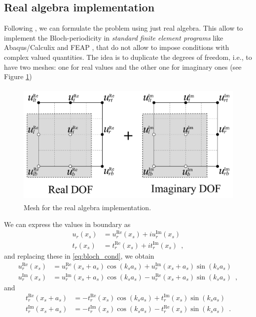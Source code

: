 \subsection{Real algebra implementation}
Following \cite{aberg1997}, we can formulate the problem using just real algebra. This allow to implement the Bloch-periodicity in \emph{standard finite element programs} like Abaqus/Calculix and FEAP \cite{feap_manual,Abaqus_manual,Calculix_manual}, that do not allow to impose conditions with complex valued quantities. The idea is to duplicate the degrees of freedom, i.e., to have two meshes: one for real values and the other one for imaginary ones (see Figure \ref{fig:double_mesh_real})
\begin{figure}[h]
\centering
\includegraphics[height=6cm]{img/cell_FEM-real_algebra.pdf} 
\caption{Mesh for the real algebra implementation.}
\label{fig:double_mesh_real}
\end{figure}

We can express the values in boundary as
\begin{align*}
u_r(x_s) &= u_r^\text{Re}(x_s) + i u_r^\text{Im}(x_s)\\
t_r(x_s) &= t_r^\text{Re}(x_s) + i t_r^\text{Im}(x_s) \enspace ,
\end{align*}
and replacing these in \eqref{eq:bloch_cond}, we obtain
\begin{subequations}
\begin{align}
u_r^\text{Re}(x_s) &= u_r^\text{Re}(x_s + a_s)\cos(k_s a_s) + u_r^\text{Im}(x_s + a_s)\sin(k_s a_s)\\
u_r^\text{Im}(x_s) &= u_r^\text{Im}(x_s + a_s)\cos(k_s a_s) - u_r^\text{Re}(x_s + a_s)\sin(k_s a_s) \enspace ,
\end{align}
\label{eq:real_bloch_disp}
\end{subequations}
and
\begin{subequations}
\begin{align}
t_r^\text{Re}(x_s + a_s) &= -t_r^\text{Re}(x_s)\cos(k_s a_s) + t_r^\text{Im}(x_s)\sin(k_s a_s)\\
t_r^\text{Im}(x_s + a_s) &= -t_r^\text{Im}(x_s)\cos(k_s a_s) - t_r^\text{Re}(x_s)\sin(k_s a_s) \enspace .
\end{align}
\label{eq:real_bloch_trac}
\end{subequations}

